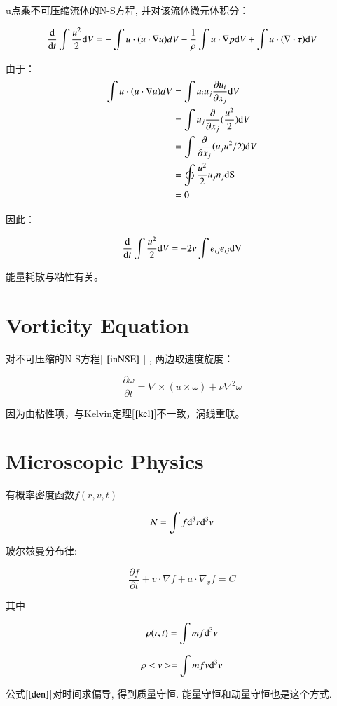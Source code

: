 \documentclass[fontset=windows]{report}
\begin{document}
u点乘不可压缩流体的N-S方程, 并对该流体微元体积分：

\[\frac{{\rm d}}{{\rm d}t}\int\frac{u^2}{2}{\rm d}V=
-\int u \cdot(u\cdot \nabla u)dV
-\frac{1}{\rho}\int u \cdot\nabla p{\rm d}V
+\int u\cdot(\nabla \cdot \tau){\rm d}V\]

由于：
\begin{equation}
  \begin{aligned}
    \int u\cdot(u\cdot\nabla u)dV
    &=\int u_iu_j\frac{\partial u_i}{\partial x_j}{\rm d}V\\
    &=\int u_j\frac{\partial}{\partial x_j}(\frac{u^2}{2}){\rm d}V\\
    &=\int \frac{\partial}{\partial x_j}(u_ju^2/2){\rm d}V \\
    &=\oint \frac{u^2}{2}u_jn_j \rm dS\\
    &=0
    \end{aligned}
\end{equation}


因此：

\[\frac{{\rm d}}{{\rm d}t}\int\frac{u^2}{2}{\rm d}V=-2\nu\int e_{ij}e_{ij}\rm dV\]

能量耗散与粘性有关。


\section{Vorticity Equation}

对不可压缩的N-S方程{[} \(\ref{inNSE}\) {]} , 两边取速度旋度：

\[\frac{\partial\omega}{\partial t}=\nabla\times(u\times\omega)+\nu\nabla^2\omega\]

因为由粘性项，与Kelvin定理{[}\(\ref{kel}\){]}不一致，涡线重联。


\section{Microscopic Physics}

有概率密度函数\(f(r,v,t)\)

\[N=\int f {\rm d^3}r {\rm d^3}v\]

玻尔兹曼分布律:

\[\frac {\partial f}{\partial t}+v\cdot\nabla f+a\cdot\nabla_v f=C\]

其中

\[\rho(r,t)=\int mf{\rm d^3}v\]

\[\rho <v> =\int mfv{\rm d^3}v  
\label{den}\]

公式{[}\(\ref{den}\){]}对时间求偏导, 得到质量守恒.
能量守恒和动量守恒也是这个方式.
\end{document}
